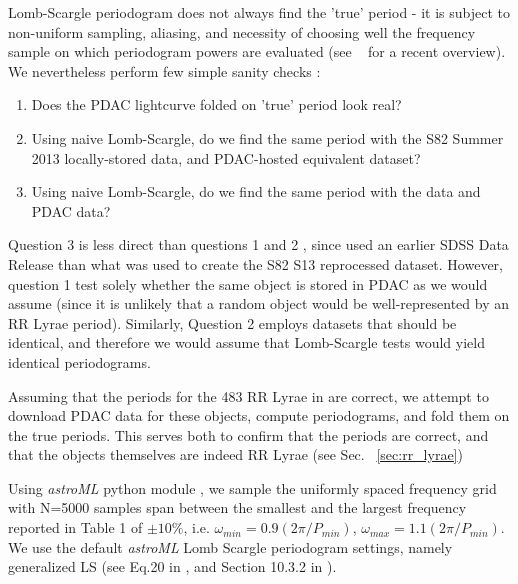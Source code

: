 \documentclass[fleqn,usenatbib]{mnras} %
\begin{document}
Lomb-Scargle periodogram does not always find the 'true' period - it is subject to non-uniform sampling,  aliasing,  and necessity of choosing well the frequency sample on which periodogram powers are evaluated (see ~\cite{vanderplas2017} for a recent overview). We nevertheless perform few simple sanity checks : 
\begin{enumerate}
	\item  Does the PDAC lightcurve folded on 'true' period look real? 
	\item  Using naive Lomb-Scargle, do we find the same period with the S82 Summer 2013 locally-stored data, and PDAC-hosted equivalent dataset?  
	\item  Using naive Lomb-Scargle, do we find the same period with the \cite{sesar2010} data and PDAC data?
	
\end{enumerate}


Question 3 is less direct than  questions 1 and 2 , since \cite{sesar2010} used an earlier SDSS Data Release than what was used to create the S82 S13 reprocessed dataset.  However,  question 1 test solely  whether the same object is stored in PDAC as we would assume (since it is unlikely that a random object would be well-represented by an RR Lyrae period). Similarly, Question 2 employs datasets that should be identical, and therefore we would assume that Lomb-Scargle tests would yield identical periodograms.  

Assuming that the periods for the 483 RR Lyrae  in \cite{sesar2010} are correct, we attempt to download PDAC data for these objects, compute periodograms, and fold them on the true periods.  This serves both to confirm that the periods are correct, and that the objects themselves are indeed RR Lyrae (see Sec. ~\ref{sec:rr_lyrae})



 Using {\it astroML} python module \citep{astroML}, we sample the uniformly spaced frequency grid with N=5000 samples span between the smallest and the largest frequency reported in Table 1 of \cite{sesar2010} $\pm 10\%$, i.e. $\omega_{min} = 0.9 ( 2 \pi / P_{min})$, $\omega_{max} = 1.1 ( 2 \pi / P_{min})$. We use the default {\it astroML} Lomb Scargle periodogram settings, namely generalized LS (see Eq.20 in \cite{zechmeister2009}, and Section 10.3.2 in \cite{ivezic2014}).   
\end{document}
